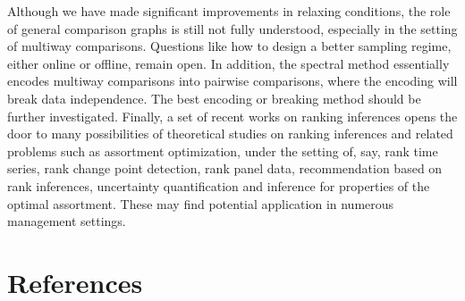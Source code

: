 Although we have made significant improvements in relaxing conditions,
the role of general comparison graphs is still not fully understood,
especially in the setting of multiway comparisons. Questions like how to
design a better sampling regime, either online or offline, remain open.
In addition, the spectral method essentially encodes multiway
comparisons into pairwise comparisons, where the encoding will break
data independence. The best encoding or breaking method should be
further investigated. Finally, a set of recent works on ranking
inferences opens the door to many possibilities of theoretical studies
on ranking inferences and related problems such as assortment
optimization, under the setting of, say, rank time series, rank change
point detection, rank panel data, recommendation based on rank
inferences, uncertainty quantification and inference for properties of
the optimal assortment. These may find potential application in numerous
management settings.

\section{References}\label{references}

